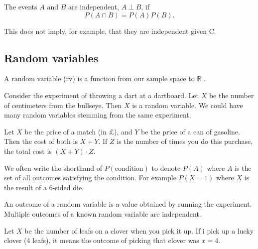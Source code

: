 \begin{definition}
	The events \(A\) and \(B\) are independent, \(A \perp B\),  if
	\[
		P(A \cap B) = P(A)P(B).
	\]
\end{definition}

\begin{obs}
	This does not imply, for example, that they are independent given C.
\end{obs}

\subsection{Random variables}

\begin{definition}
	A random variable (rv) is a function from our sample space to \(\mathbb{R}\) .
\end{definition}

\begin{example}
	Consider the experiment of throwing a dart at a dartboard. Let \(X\) be the number of centimeters from the bullseye. Then \(X\) is a random variable. We could have many random variables stemming from the same experiment.
\end{example}

\begin{example}
	Let \(X\) be the price of a match (in £), and \(Y\) be the price of a can of gasoline. Then the cost of both is \(X + Y\). If \(Z\) is the number of times you do this purchase, the total cost is \((X+Y) \cdot Z\).
\end{example}

\begin{obs}
	We often write the shorthand of \(P(\text{condition} )\) to denote \(P(A)\) where \(A\) is the set of all outcomes satisfying the condition. For example \(P(X = 1)\) where \(X\) is the result of a 6-sided die.
\end{obs}

\begin{definition}
	An outcome of a random variable is a value obtained by running the experiment. Multiple outcomes of a known random variable are independent.
\end{definition}

\begin{example}
	Let \(X\) be the number of leafs on a clover when you pick it up. If i pick up a lucky clover (4 leafs), it means the outcome of picking that clover was \(x = 4\).
\end{example}

